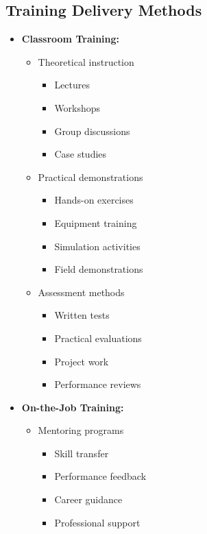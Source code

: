 \subsection{Training Delivery Methods}
\begin{itemize}
    \item \textbf{Classroom Training:}
    \begin{itemize}
        \item Theoretical instruction
        \begin{itemize}
            \item Lectures
            \item Workshops
            \item Group discussions
            \item Case studies
        \end{itemize}
        
        \item Practical demonstrations
        \begin{itemize}
            \item Hands-on exercises
            \item Equipment training
            \item Simulation activities
            \item Field demonstrations
        \end{itemize}
        
        \item Assessment methods
        \begin{itemize}
            \item Written tests
            \item Practical evaluations
            \item Project work
            \item Performance reviews
        \end{itemize}
    \end{itemize}
    
    \item \textbf{On-the-Job Training:}
    \begin{itemize}
        \item Mentoring programs
        \begin{itemize}
            \item Skill transfer
            \item Performance feedback
            \item Career guidance
            \item Professional support
        \end{itemize}
        

\end{itemize}
\end{itemize}
